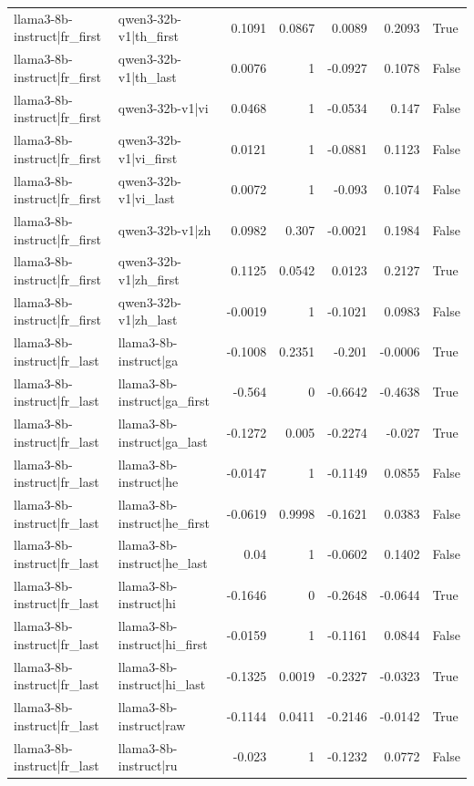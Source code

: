 \begin{table}
\begin{tabular}{l l r r r r l}
llama3-8b-instruct|fr_first & qwen3-32b-v1|th_first & 0.1091 & 0.0867 & 0.0089 & 0.2093 & True \\
llama3-8b-instruct|fr_first & qwen3-32b-v1|th_last & 0.0076 & 1 & -0.0927 & 0.1078 & False \\
llama3-8b-instruct|fr_first & qwen3-32b-v1|vi & 0.0468 & 1 & -0.0534 & 0.147 & False \\
llama3-8b-instruct|fr_first & qwen3-32b-v1|vi_first & 0.0121 & 1 & -0.0881 & 0.1123 & False \\
llama3-8b-instruct|fr_first & qwen3-32b-v1|vi_last & 0.0072 & 1 & -0.093 & 0.1074 & False \\
llama3-8b-instruct|fr_first & qwen3-32b-v1|zh & 0.0982 & 0.307 & -0.0021 & 0.1984 & False \\
llama3-8b-instruct|fr_first & qwen3-32b-v1|zh_first & 0.1125 & 0.0542 & 0.0123 & 0.2127 & True \\
llama3-8b-instruct|fr_first & qwen3-32b-v1|zh_last & -0.0019 & 1 & -0.1021 & 0.0983 & False \\
llama3-8b-instruct|fr_last & llama3-8b-instruct|ga & -0.1008 & 0.2351 & -0.201 & -0.0006 & True \\
llama3-8b-instruct|fr_last & llama3-8b-instruct|ga_first & -0.564 & 0 & -0.6642 & -0.4638 & True \\
llama3-8b-instruct|fr_last & llama3-8b-instruct|ga_last & -0.1272 & 0.005 & -0.2274 & -0.027 & True \\
llama3-8b-instruct|fr_last & llama3-8b-instruct|he & -0.0147 & 1 & -0.1149 & 0.0855 & False \\
llama3-8b-instruct|fr_last & llama3-8b-instruct|he_first & -0.0619 & 0.9998 & -0.1621 & 0.0383 & False \\
llama3-8b-instruct|fr_last & llama3-8b-instruct|he_last & 0.04 & 1 & -0.0602 & 0.1402 & False \\
llama3-8b-instruct|fr_last & llama3-8b-instruct|hi & -0.1646 & 0 & -0.2648 & -0.0644 & True \\
llama3-8b-instruct|fr_last & llama3-8b-instruct|hi_first & -0.0159 & 1 & -0.1161 & 0.0844 & False \\
llama3-8b-instruct|fr_last & llama3-8b-instruct|hi_last & -0.1325 & 0.0019 & -0.2327 & -0.0323 & True \\
llama3-8b-instruct|fr_last & llama3-8b-instruct|raw & -0.1144 & 0.0411 & -0.2146 & -0.0142 & True \\
llama3-8b-instruct|fr_last & llama3-8b-instruct|ru & -0.023 & 1 & -0.1232 & 0.0772 & False \\

\end{tabular}
\end{table}
